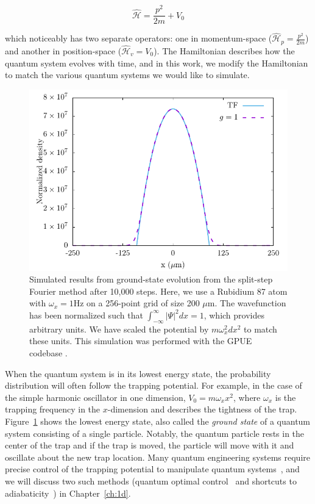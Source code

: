 \begin{equation}
\mathcal{\hat H} = \frac{p^2}{2m} + V_0
\end{equation}

\noindent which noticeably has two separate operators: one in momentum-space ($\mathcal{\hat H}_p = \frac{p^2}{2m}$) and another in position-space ($\mathcal{\hat H}_v = V_0$).
The Hamiltonian describes how the quantum system evolves with time, and in this work, we modify the Hamiltonian to match the various quantum systems we would like to simulate.

\begin{figure}

\includegraphics[width = \textwidth]{data/qs/SHO/SHO.pdf}

\caption{Simulated results from ground-state evolution from the split-step Fourier method after 10,000 steps. Here, we use a Rubidium 87 atom with $\omega_x = 1$Hz on a 256-point grid of size 200 $\mu$m. The wavefunction has been normalized such that $\int_{-\infty}^\infty|\Psi|^2 dx = 1$, which provides arbitrary units. We have scaled the potential by $m \omega_x^2 dx^2$ to match these units. This simulation was performed with the GPUE codebase \cite{schloss2018}.}
\label{fig:SHO}
\end{figure}

When the quantum system is in its lowest energy state, the probability distribution will often follow the trapping potential.
For example, in the case of the simple harmonic oscillator in one dimension, $V_0 = m \omega_x x^2$, where $\omega_x$ is the trapping frequency in the $x$-dimension and describes the tightness of the trap.
Figure~\ref{fig:SHO} shows the lowest energy state, also called the \textit{ground state} of a quantum system consisting of a single particle.
Notably, the quantum particle rests in the center of the trap and if the trap is moved, the particle will move with it and oscillate about the new trap location.
Many quantum engineering systems require precise control of the trapping potential to manipulate quantum systems~\cite{menchon2016}, and we will discuss two such methods (quantum optimal control~\cite{werschnik2007} and shortcuts to adiabaticity~\cite{guery2019}) in Chapter~\ref{ch:1d}.

